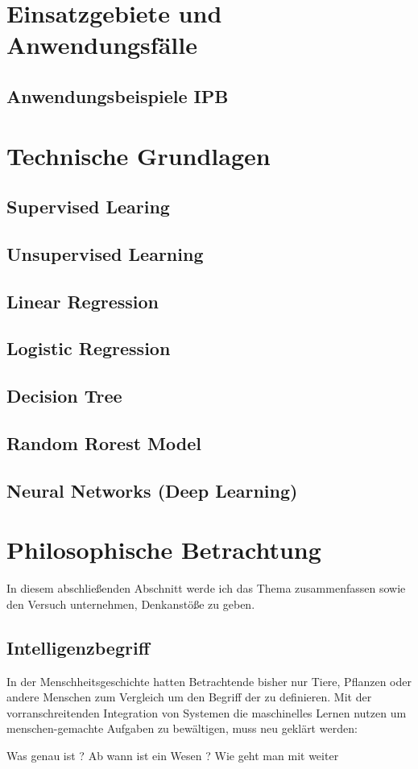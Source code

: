\documentclass[12pt]{report}
\begin{document}
    \section{Einsatzgebiete und Anwendungsfälle}

    \subsection{Anwendungsbeispiele IPB}
    \section{Technische Grundlagen}
    \subsection{Supervised Learing}
    \subsection{Unsupervised Learning}
    \subsection{Linear Regression}
    \subsection{Logistic Regression}
    \subsection{Decision Tree}
    \subsection{Random Rorest Model}
    \subsection{Neural Networks (Deep Learning)}
    \section{Philosophische Betrachtung}
    In diesem abschließenden Abschnitt werde ich das Thema zusammenfassen sowie den Versuch unternehmen,
    Denkanstöße zu geben.
    \subsection{Intelligenzbegriff}
    In der Menschheitsgeschichte hatten Betrachtende bisher nur Tiere, Pflanzen oder andere Menschen zum Vergleich
    um den Begriff der  zu definieren. Mit der vorranschreitenden Integration von Systemen die maschinelles
    Lernen nutzen um menschen-gemachte Aufgaben zu bewältigen, muss neu geklärt werden:
        \begin{displayquote}
            Was genau ist ?
            Ab wann ist ein Wesen ?
            Wie geht man mit weiter
        \end{displayquote}

    \printbibliography
\end{document}
